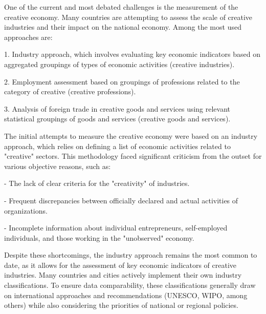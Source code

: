 \begin{multicols}{2}
One of the current and most debated challenges is the measurement of the
creative economy. Many countries are attempting to assess the scale of
creative industries and their impact on the national economy. Among the
most used approaches are:

1. Industry approach, which involves evaluating key economic indicators
based on aggregated groupings of types of economic activities (creative
industries).

2. Employment assessment based on groupings of professions related to
the category of creative (creative professions).

3. Analysis of foreign trade in creative goods and services using
relevant statistical groupings of goods and services (creative goods and
services).

The initial attempts to measure the creative economy were based on an
industry approach, which relies on defining a list of economic
activities related to "creative" sectors. This methodology faced
significant criticism from the outset for various objective reasons,
such as:

- The lack of clear criteria for the "creativity" of industries.

- Frequent discrepancies between officially declared and actual
activities of organizations.

- Incomplete information about individual entrepreneurs, self-employed
individuals, and those working in the "unobserved" economy.

Despite these shortcomings, the industry approach remains the most
common to date, as it allows for the assessment of key economic
indicators of creative industries. Many countries and cities actively
implement their own industry classifications. To ensure data
comparability, these classifications generally draw on international
approaches and recommendations (UNESCO, WIPO, among others) while also
considering the priorities of national or regional policies.
\end{multicols}

